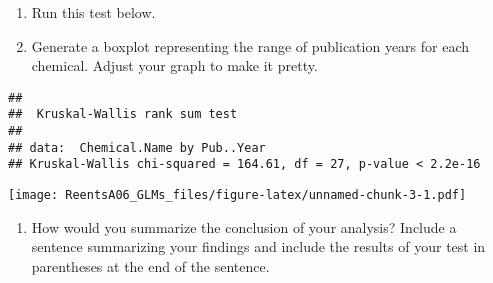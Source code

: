 \documentclass[]{article}
\newenvironment{Shaded}{\begin{snugshade}}{\end{snugshade}}
\newcommand{\KeywordTok}[1]{\textcolor[rgb]{0.13,0.29,0.53}{\textbf{#1}}}
\newcommand{\DataTypeTok}[1]{\textcolor[rgb]{0.13,0.29,0.53}{#1}}
\newcommand{\DecValTok}[1]{\textcolor[rgb]{0.00,0.00,0.81}{#1}}
\newcommand{\FloatTok}[1]{\textcolor[rgb]{0.00,0.00,0.81}{#1}}
\newcommand{\StringTok}[1]{\textcolor[rgb]{0.31,0.60,0.02}{#1}}
\newcommand{\CommentTok}[1]{\textcolor[rgb]{0.56,0.35,0.01}{\textit{#1}}}
\newcommand{\OperatorTok}[1]{\textcolor[rgb]{0.81,0.36,0.00}{\textbf{#1}}}
\newcommand{\NormalTok}[1]{#1}
\providecommand{\tightlist}{%
  \setlength{\itemsep}{0pt}\setlength{\parskip}{0pt}}
\begin{document}
\begin{enumerate}
\def\labelenumi{\arabic{enumi}.}
\setcounter{enumi}{6}
\item
  Run this test below.
\item
  Generate a boxplot representing the range of publication years for
  each chemical. Adjust your graph to make it pretty.
\end{enumerate}

\begin{Shaded}
\end{Shaded}

\begin{verbatim}
## 
##  Kruskal-Wallis rank sum test
## 
## data:  Chemical.Name by Pub..Year
## Kruskal-Wallis chi-squared = 164.61, df = 27, p-value < 2.2e-16
\end{verbatim}

\begin{Shaded}
\end{Shaded}

\texttt{[image: ReentsA06\_GLMs\_files/figure-latex/unnamed-chunk-3-1.pdf]}

\begin{enumerate}
\def\labelenumi{\arabic{enumi}.}
\setcounter{enumi}{8}
\tightlist
\item
  How would you summarize the conclusion of your analysis? Include a
  sentence summarizing your findings and include the results of your
  test in parentheses at the end of the sentence.
\end{enumerate}
\end{document}
